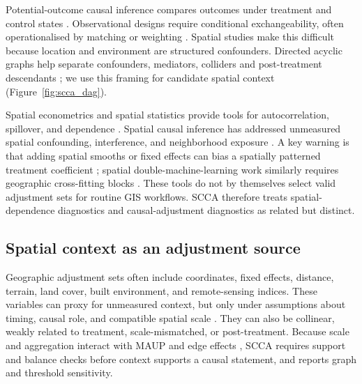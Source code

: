 \documentclass{article}
\begin{document}
Potential-outcome causal inference compares outcomes under treatment and control states \citep{imbens2015causal,hernan2020whatif}. Observational designs require conditional exchangeability, often operationalised by matching or weighting \citep{rosenbaum1983central, stuart2010matching}. Spatial studies make this difficult because location and environment are structured confounders. Directed acyclic graphs help separate confounders, mediators, colliders and post-treatment descendants \citep{pearl2009causality,vanderweele2015explanation}; we use this framing for candidate spatial context (Figure~\ref{fig:scca_dag}).

Spatial econometrics and spatial statistics provide tools for autocorrelation, spillover, and dependence \citep{anselin1988spatial,lesage2009introduction,anselin2014modern}. Spatial causal inference has addressed unmeasured spatial confounding, interference, and neighborhood exposure \citep{reich2021review,gilbert2021spatialconfounding,giffin2023gpsinterference,papadogeorgou2022causal,schnell2020mitigating}. A key warning is that adding spatial smooths or fixed effects can bias a spatially patterned treatment coefficient \citep{hodges2010adding,paciorek2010importance,dupont2022spatial+,khan2022restricted}; spatial double-machine-learning work similarly requires geographic cross-fitting blocks \citep{tec2023spatialdml}. These tools do not by themselves select valid adjustment sets for routine GIS workflows. SCCA therefore treats spatial-dependence diagnostics and causal-adjustment diagnostics as related but distinct.

\subsection{Spatial context as an adjustment source}

Geographic adjustment sets often include coordinates, fixed effects, distance, terrain, land cover, built environment, and remote-sensing indices. These variables can proxy for unmeasured context, but only under assumptions about timing, causal role, and compatible spatial scale \citep{gilbert2021spatialconfounding,vanderweele2015explanation}. They can also be collinear, weakly related to treatment, scale-mismatched, or post-treatment. Because scale and aggregation interact with MAUP and edge effects \citep{openshaw1984maup,fotheringham1991modifiable,manley2006maup}, SCCA requires support and balance checks before context supports a causal statement, and reports graph and threshold sensitivity.
\end{document}
